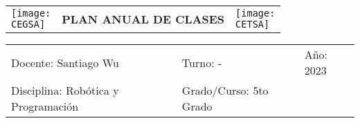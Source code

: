 \documentclass[landscape, a4paper, 10pt]{article}
\newcommand{\profesor}{Santiago Wu}
\newcommand{\discipline}{Robótica y Programación}
\newcommand{\currentyear}{2023}
\newcommand{\CEGSA}{cegsa-logo.png}
\newcommand{\CETSA}{cetsa-logo.png}
\begin{document}
	\pagebreak[4]
	\begin{tabularx}{\textwidth}{ >{\raggedright\arraybackslash}X >{\centering\arraybackslash}X >{\raggedleft\arraybackslash}X }
		\texttt{[image: \\CEGSA]} &
		\textbf{PLAN ANUAL DE CLASES} &
		\texttt{[image: \\CETSA]}
	\end{tabularx}
	\begin{tabularx}{\textwidth}{ >{\raggedright\arraybackslash}X >{\raggedright\arraybackslash}X >{\raggedright\arraybackslash}X }
		Docente: \profesor &
		Turno: - &
		Año: \currentyear \\
		Disciplina: \discipline &
		Grado/Curso: 5to Grado &
		 \\
	\end{tabularx}
	\centering
\end{document}
